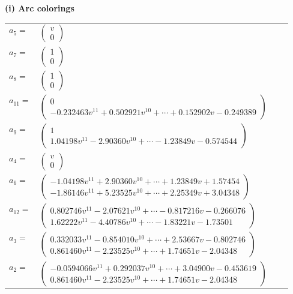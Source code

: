 \documentclass[1p]{elsarticle_modified}
\theoremstyle{definition}
\begin{document}
\flushleft \textbf{(i) Arc colorings}\\
\begin{tabular}{m{7pt} m{180pt} m{7pt} m{180pt} }
\flushright $a_{5}=$&$\begin{pmatrix}v\\0\end{pmatrix}$ \\
\flushright $a_{7}=$&$\begin{pmatrix}1\\0\end{pmatrix}$ \\
\flushright $a_{8}=$&$\begin{pmatrix}1\\0\end{pmatrix}$ \\
\flushright $a_{11}=$&$\begin{pmatrix}0\\-0.232463 v^{11}+0.502921 v^{10}+\cdots+0.152902 v-0.249389\end{pmatrix}$ \\
\flushright $a_{9}=$&$\begin{pmatrix}1\\1.04198 v^{11}-2.90360 v^{10}+\cdots-1.23849 v-0.574544\end{pmatrix}$ \\
\flushright $a_{4}=$&$\begin{pmatrix}v\\0\end{pmatrix}$ \\
\flushright $a_{6}=$&$\begin{pmatrix}-1.04198 v^{11}+2.90360 v^{10}+\cdots+1.23849 v+1.57454\\-1.86146 v^{11}+5.23525 v^{10}+\cdots+2.25349 v+3.04348\end{pmatrix}$ \\
\flushright $a_{12}=$&$\begin{pmatrix}0.802746 v^{11}-2.07621 v^{10}+\cdots-0.817216 v-0.266076\\1.62222 v^{11}-4.40786 v^{10}+\cdots-1.83221 v-1.73501\end{pmatrix}$ \\
\flushright $a_{3}=$&$\begin{pmatrix}0.332033 v^{11}-0.854010 v^{10}+\cdots+2.53667 v-0.802746\\0.861460 v^{11}-2.23525 v^{10}+\cdots+1.74651 v-2.04348\end{pmatrix}$ \\
\flushright $a_{2}=$&$\begin{pmatrix}-0.0594066 v^{11}+0.292037 v^{10}+\cdots+3.04900 v-0.453619\\0.861460 v^{11}-2.23525 v^{10}+\cdots+1.74651 v-2.04348\end{pmatrix}$ \\

\end{tabular}
\end{document}
